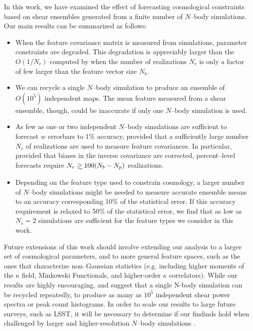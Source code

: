 \documentclass[reprint,aps,prd,superscriptaddress,showkeys,showpacs]{revtex4-1}
\newcommand\gsim{\mathrel{\rlap{\lower4pt\hbox{\hskip1pt$\sim$}}
        \raise1pt\hbox{$>$}}}
\begin{document}
In this work, we have examined the effect of forecasting cosmological
constraints based on shear ensembles generated from a finite number of
$N$--body simulations.  Our main results can be summarized as follows:
\vspace{0.4\baselineskip}
\begin{itemize}

\item When the feature covariance matrix is measured from simulations,
  parameter constraints are degraded. This degradation is appreciably
  larger than the $O(1/N_r)$ computed by \citep{DodelsonSchneider13}
  when the number of realizations $N_r$ is only a factor of few larger
  than the feature vector size $N_b$.
\item We can recycle a single $N$--body simulation to produce an
  ensemble of $O(10^5)$ independent maps. The mean feature measured
  from a shear ensemble, though, could be inaccurate if only one
  $N$--body simulation is used.
\item As few as one or two independent $N$--body simulations are
  sufficient to forecast $w$ errorbars to 1\% accuracy, provided that
  a sufficiently large number $N_r$ of realizations are used to
  measure feature covariances.  In particular, provided that biases
  in the inverse covariance are corrected, percent--level forecasts
  require $N_r\gsim 100 (N_b-N_p)$ realizations.
\item Depending on the feature type used to constrain cosmology, a
  larger number of $N$--body simulations might be needed to measure
  accurate ensemble means to an accuracy corresponding 10\% of the
  statistical error. If this accuracy requirement is relaxed to 50\%
  of the statistical error, we find that as low as $N_s=2$ simulations
  are sufficient for the feature types we consider in this work.
\end{itemize}
%
Future extensions of this work should involve extending our analysis
to a larger set of cosmological parameters, and to more general
feature spaces, such as the ones that characterize non--Gaussian
statistics (e.g. including higher moments of the $\kappa$ field,
Minkowski Functionals, and higher-order $\kappa$ correlators). While
our results are highly encouraging, and suggest that a single N-body
simulation can be recycled repeatedly, to produce as many as $10^5$
independent shear power spectra or peak count histograms. In order to
scale our results to large future surveys, such as LSST, it will be
necessary to determine if our findinds hold when challenged by larger
and higher-resolution $N$--body simulations \citep{Qcontinuum}.
\end{document}
